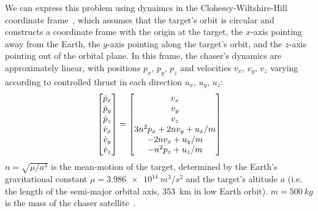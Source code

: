 We can express this problem using dynaimcs in the Clohessy-Wiltshire-Hill coordinate frame~\cite{jewisonSpacecraftBenchmarkProblem2016}, which assumes that the target's orbit is circular and constructs a coordinate frame with the origin at the target, the $x$-axis pointing away from the Earth, the $y$-axis pointing along the target's orbit, and the $z$-axis pointing out of the orbital plane. In this frame, the chaser's dynamics are approximately linear, with positions $p_x$, $p_y$, $p_z$ and velocities $v_x$, $v_y$, $v_z$ varying according to controlled thrust in each direction $u_x$, $u_y$, $u_z$:
\begin{align*}
    \begin{bmatrix}\dot{p}_x              \\ \dot{p}_y \\ \dot{p}_z \\ \dot{v}_x \\ \dot{v}_y \\ \dot{v}_z\end{bmatrix} = \begin{bmatrix}
    v_x                         \\
    v_y                         \\
    v_z                         \\
    3n^2 p_x + 2n v_y + u_x / m \\
    -2n v_x + u_y / m           \\
        -n^2 p_z + u_z / m
    \end{bmatrix}
\end{align*}
%
$n = \sqrt{\mu / a^3}$ is the mean-motion of the target, determined by the Earth's gravitational constant $\mu = \SI{3.986e14}{m^3/s^2}$ and the target's altitude $a$ (i.e. the length of the semi-major orbital axis, \SI{353}{km} in low Earth orbit). $m = \SI{500}{kg}$ is the mass of the chaser satellite~\cite{jewisonSpacecraftBenchmarkProblem2016}.